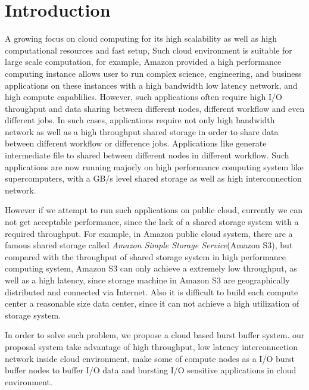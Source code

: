 \section{Introduction}
\label{sec:introduction}
A growing focus on cloud computing for its high scalability as well as high computational resources and fast setup, 
Such cloud environment is suitable for large scale computation, for example, Amazon provided a high performance computing instance allows user to run complex science, engineering, and business applications on these instances with a high bandwidth low latency network, and high compute capablilies.
However, such applications often require high I/O throughput and data sharing between different nodes, different workflow and even different jobs.
In such cases, applications require not only high bandwidth network as well as a high throughput shared storage in order to share data between different workflow or difference jobs.
Applications like generate  intermediate file to shared between different nodes in different workflow.
Such applications are now running majorly on high performance computing system like supercomputers, with a GB/s level shared storage as well as high interconnection network.

However if we attempt to run such applications on public cloud, currently we can not get acceptable performance, since the lack of a shared storage system with a required throughput.
For example, in Amazon public cloud system, there are a famous shared storage called \emph{Amazon Simple Storage Service}(Amazon S3), but compared with the throughput of shared storage system in high performance computing system,
Amazon S3 can only achieve a extremely low throughput, as well as a high latency, since storage machine in Amazon S3 are geographically distributed and connected via Internet.
Also it is difficult to build each compute center a reasonable size data center, since it can not achieve a high utilization of storage system.

In order to solve such problem, we propose a cloud based burst buffer system. our proposal system take advantage of high throughput, low latency interconnection network inside cloud environment,
make some of compute nodes as a I/O burst buffer nodes to buffer I/O data and bursting I/O sensitive applications in cloud environment.

